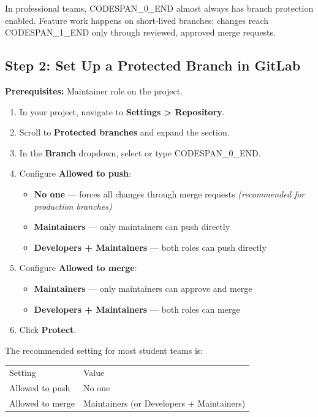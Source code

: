 \documentclass[11pt,a4paper]{book}
\begin{document}
In professional teams, CODESPAN\_0\_END almost always has branch protection enabled. Feature work happens on short-lived branches; changes reach CODESPAN\_1\_END only through reviewed, approved merge requests.

\medskip

\subsection{Step 2: Set Up a Protected Branch in GitLab}

\textbf{Prerequisites:} Maintainer role on the project.

\begin{enumerate}
  \item In your project, navigate to \textbf{Settings > Repository}.
  \item Scroll to \textbf{Protected branches} and expand the section.
  \item In the \textbf{Branch} dropdown, select or type CODESPAN\_0\_END.
  \item Configure \textbf{Allowed to push}:
\begin{itemize}
  \item \textbf{No one} --- forces all changes through merge requests \textit{(recommended for production branches)}
  \item \textbf{Maintainers} --- only maintainers can push directly
  \item \textbf{Developers + Maintainers} --- both roles can push directly
\end{itemize}
  \item Configure \textbf{Allowed to merge}:
\begin{itemize}
  \item \textbf{Maintainers} --- only maintainers can approve and merge
  \item \textbf{Developers + Maintainers} --- both roles can merge
\end{itemize}
  \item Click \textbf{Protect}.
\end{enumerate}

The recommended setting for most student teams is:

\begin{tabular}{ll}
\hline
Setting & Value \\
Allowed to push & No one \\
Allowed to merge & Maintainers (or Developers + Maintainers) \\
\hline
\end{tabular}
\end{document}
